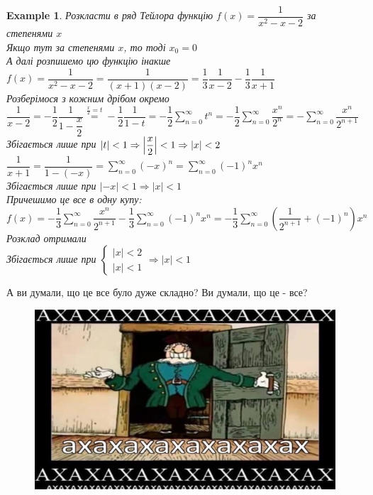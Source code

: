 \documentclass[a4paper, 14pt]{extarticle}
\def\huge{\displaystyle}
\theoremstyle{theoremdd}
\theoremstyle{theoremdd}
\theoremstyle{theoremdd}
\theoremstyle{theoremdd}
\newtheorem{example}[theorem]{Example}
\theoremstyle{theoremdd}
\theoremstyle{theoremdd}
\theoremstyle{theoremdd}
\theoremstyle{theoremdd}
\begin{document}
\begin{example}
Розкласти в ряд Тейлора функцію $f(x) = \dfrac{1}{x^2-x-2}$ за степенями $x$\\
Якщо тут за степенями $x$, то тоді $x_0 = 0$\\
А далі розпишемо цю функцію інакше\\
$f(x) = \dfrac{1}{x^2-x-2} = \dfrac{1}{(x+1)(x-2)} = \dfrac{1}{3} \dfrac{1}{x-2} - \dfrac{1}{3} \dfrac{1}{x+1}$\\
Розберімося з кожним дрібом окремо\\
$\dfrac{1}{x-2} = -\dfrac{1}{2} \dfrac{1}{1 - \dfrac{x}{2}} \overset{\frac{x}{2}=t}{=} -\dfrac{1}{2} \dfrac{1}{1-t} = -\dfrac{1}{2} \huge\sum_{n=0}^\infty t^n = -\dfrac{1}{2} \huge\sum_{n=0}^\infty \dfrac{x^n}{2^n} = -\sum_{n=0}^\infty \dfrac{x^n}{2^{n+1}}$\\
Збігається лише при $|t| < 1 \Rightarrow \abs{\dfrac{x}{2}} < 1 \Rightarrow |x|<2$
$\dfrac{1}{x+1} = \dfrac{1}{1-(-x)} = \huge\sum_{n=0}^\infty (-x)^n = \sum_{n=0}^\infty (-1)^n x^n$\\
Збігається лише при $|-x| < 1 \Rightarrow |x| < 1$\\
Причешимо це все в одну купу:\\
$f(x) = -\dfrac{1}{3} \huge\sum_{n=0}^\infty \dfrac{x^n}{2^{n+1}} - \dfrac{1}{3} \huge\sum_{n=0}^\infty (-1)^n x^n = -\dfrac{1}{3} \huge\sum_{n=0}^\infty \left(\dfrac{1}{2^{n+1}} + (-1)^n \right) x^n$\\
Розклад отримали\\
Збігається лише при $\begin{cases} |x| < 2 \\ |x| < 1 \end{cases} \Rightarrow |x| < 1$
\end{example}
\newpage
А ви думали, що це все було дуже складно? Ви думали, що це - все?\\
\begin{figure}[H]
\centering
\includegraphics[scale=0.8]{Livsi.jpg}
\end{figure}
\newpage
\end{document}
